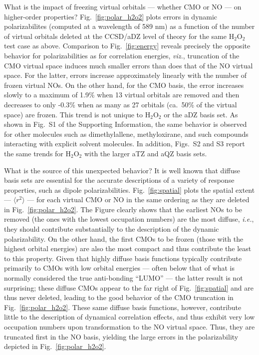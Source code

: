 \documentclass[journal=jpccck,manuscript=article]{achemso}
\begin{document}
What is the impact of freezing virtual orbitals --- whether CMO or NO --- on
higher-order properties?  Fig.\ \ref{fig:polar_h2o2} plots errors in dynamic
polarizabilites (computed at a wavelength of 589 nm) as a function of the
number of virtual orbitals deleted at the CCSD/aDZ level of theory for the
same H$_2$O$_2$ test case as above.  Comparison to Fig.\ \ref{fig:energy}
reveals precisely the opposite behavior for polarizabilities as for
correlation energies, {\em viz.}, truncation of the CMO virtual space induces
much smaller errors than does that of the NO virtual space.  For the latter,
errors increase approximately linearly with the number of frozen virtual NOs.
On the other hand, for the CMO basis, the error increases slowly to a maximum
of 1.9\% when 13 virtual orbitals are removed and then decreases to only
-0.3\% when as many as 27 orbitals (ca.\ 50\% of the virtual space) are
frozen.  This trend is not unique to H$_2$O$_2$ or the aDZ basis set. As shown
in Fig.~S1 of the Supporting Information, the same behavior is observed for
other molecules such as dimethylallene, methyloxirane, and such compounds
interacting with explicit solvent molecules.  In addition, Figs.~S2 and S3
report the same trends for H$_2$O$_2$ with the larger aTZ and aQZ basis sets.


What is the source of this unexpected behavior?  It is well known that diffuse
basis sets are essential for the accurate descriptions of a variety of
response properties, such as dipole polarizabilities.\cite{Woon94}  Fig.~\ref{fig:spatial}
plots the spatial extent --- $\langle r^2 \rangle$ --- for each virtual CMO or
NO in the same ordering as they are deleted in Fig.~\ref{fig:polar_h2o2}.  The
Figure clearly shows that the earliest NOs to be removed (the ones with the
lowest occupation numbers) are the most diffuse, {\em i.e.}, they should
contribute substantially to the description of the dynamic polarizability.  On
the other hand, the first CMOs to be frozen (those with the highest orbital
energies) are also the most compact and thus contribute the least to this
property.  Given that highly diffuse basis functions typically contribute
primarily to CMOs with low orbital energies --- often below that of what is
normally considered the true anti-bonding ``LUMO'' --- the latter result is
not surprising; these diffuse CMOs appear to the far right of
Fig.~\ref{fig:spatial} and are thus never deleted, leading to the good
behavior of the CMO truncation in Fig.~\ref{fig:polar_h2o2}.  These same
diffuse basis functions, however, contribute little to the description of
dynamical correlation effects, and thus exhibit very low occupation numbers
upon transformation to the NO virtual space.  Thus, they are truncated first
in the NO basis, yielding the large errors in the polarizability depicted in
Fig.~\ref{fig:polar_h2o2}.
\end{document}
